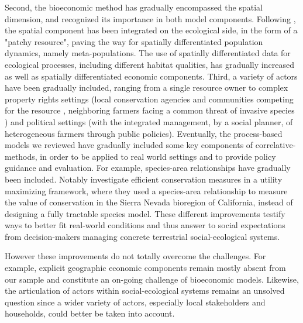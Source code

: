 Second, the bioeconomic method has gradually encompassed the spatial dimension, and recognized its importance in both model components. Following \cite{Sanchirico1999}, the spatial component has been integrated on the ecological side, in the form of a "patchy resource", paving the way for spatially differentiated population dynamics, namely meta-populations. The use of spatially differentiated data for ecological processes, including different habitat qualities, has gradually increased as well as spatially differentiated economic components. 
Third, a variety of actors have been gradually included, ranging from a single resource owner to complex property rights settings (local conservation agencies and communities competing for the resource \citep{Skonhoft1998} , neighboring farmers facing a common threat of invasive species \citep{Fenichel2014}) and political settings (with the integrated management, by a social planner, of heterogeneous farmers \citep{Mouysset2014} through public policies). 
Eventually, the process-based models we reviewed have gradually included some key components of correlative-methods, in order to be applied to real world settings and to provide policy guidance and evaluation. For example, species-area relationships have gradually been included. Notably \cite{Davis2006} investigate efficient conservation measures in a utility maximizing framework, where they used a species-area relationship to measure the value of conservation in the Sierra Nevada bioregion of California, instead of designing a fully tractable species model.   
These different improvements testify ways 
to better fit real-world conditions and thus answer to social expectations from decision-makers managing concrete terrestrial social-ecological systems. 

However these improvements do not totally overcome the challenges. For example, explicit geographic economic components remain mostly absent from our sample and constitute an on-going challenge of bioeconomic models. Likewise, the articulation of actors within social-ecological systems remains an unsolved question since a wider variety of actors, especially local stakeholders and households, could better be taken into account.

